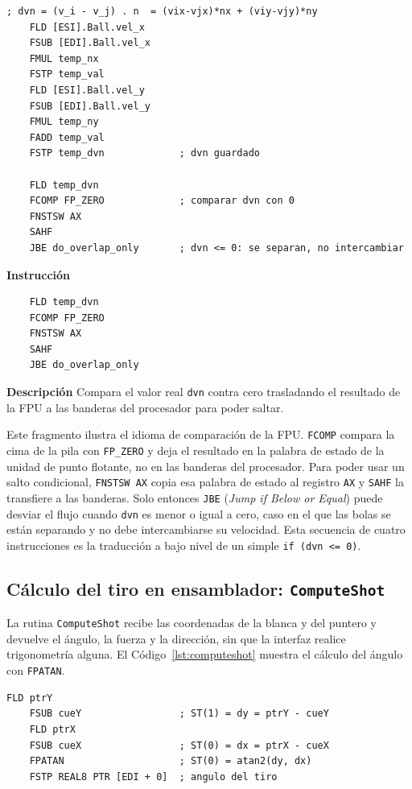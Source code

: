 \documentclass[a4paper,12pt]{article}
\begin{document}
\begin{lstlisting}[style=assemblyStyle, caption={Producto punto sobre la normal y decisión de intercambio en \texttt{ResolveBallCollision}.}, label={lst:colision}]
    ; dvn = (v_i - v_j) . n  = (vix-vjx)*nx + (viy-vjy)*ny
    FLD [ESI].Ball.vel_x
    FSUB [EDI].Ball.vel_x
    FMUL temp_nx
    FSTP temp_val
    FLD [ESI].Ball.vel_y
    FSUB [EDI].Ball.vel_y
    FMUL temp_ny
    FADD temp_val
    FSTP temp_dvn             ; dvn guardado

    FLD temp_dvn
    FCOMP FP_ZERO             ; comparar dvn con 0
    FNSTSW AX
    SAHF
    JBE do_overlap_only       ; dvn <= 0: se separan, no intercambiar
\end{lstlisting}

\begin{instruccionbox}
\textbf{Instrucción}
\begin{lstlisting}
    FLD temp_dvn
    FCOMP FP_ZERO
    FNSTSW AX
    SAHF
    JBE do_overlap_only
\end{lstlisting}
\textbf{Descripción}
Compara el valor real \texttt{dvn} contra cero trasladando el resultado de la FPU a las banderas del procesador para poder saltar.
\end{instruccionbox}

Este fragmento ilustra el idioma de comparación de la FPU. \texttt{FCOMP} compara la cima de la pila con \texttt{FP\_ZERO} y deja el resultado en la palabra de estado de la unidad de punto flotante, no en las banderas del procesador. Para poder usar un salto condicional, \texttt{FNSTSW AX} copia esa palabra de estado al registro \texttt{AX} y \texttt{SAHF} la transfiere a las banderas. Solo entonces \texttt{JBE} (\textit{Jump if Below or Equal}) puede desviar el flujo cuando \texttt{dvn} es menor o igual a cero, caso en el que las bolas se están separando y no debe intercambiarse su velocidad. Esta secuencia de cuatro instrucciones es la traducción a bajo nivel de un simple \texttt{if (dvn <= 0)}.

\subsection{Cálculo del tiro en ensamblador: \texttt{ComputeShot}}
La rutina \texttt{ComputeShot} recibe las coordenadas de la blanca y del puntero y devuelve el ángulo, la fuerza y la dirección, sin que la interfaz realice trigonometría alguna. El Código~\ref{lst:computeshot} muestra el cálculo del ángulo con \texttt{FPATAN}.

\begin{lstlisting}[style=assemblyStyle, caption={Cálculo del ángulo del tiro con \texttt{FPATAN} (equivalente a \texttt{atan2}).}, label={lst:computeshot}]
    FLD ptrY
    FSUB cueY                 ; ST(1) = dy = ptrY - cueY
    FLD ptrX
    FSUB cueX                 ; ST(0) = dx = ptrX - cueX
    FPATAN                    ; ST(0) = atan2(dy, dx)
    FSTP REAL8 PTR [EDI + 0]  ; angulo del tiro
\end{lstlisting}
\end{document}
